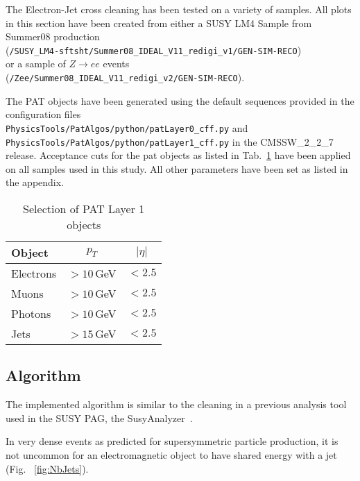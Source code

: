 \documentclass{cmspaper}
\begin{document}
The Electron-Jet cross cleaning has been tested on a variety of samples. All
plots in this section have been created from either a SUSY LM4 Sample from
Summer08 production\\
(\texttt{/SUSY\_LM4-sftsht/Summer08\_IDEAL\_V11\_redigi\_v1/GEN-SIM-RECO})\\
or a sample of
$Z\rightarrow ee$ events \\(\texttt{/Zee/Summer08\_IDEAL\_V11\_redigi\_v2/GEN-SIM-RECO}).

The PAT objects have been generated using the default sequences provided in the
configuration files\\
\texttt{PhysicsTools/PatAlgos/python/patLayer0\_cff.py} and\\
\texttt{PhysicsTools/PatAlgos/python/patLayer1\_cff.py} in the CMSSW\_2\_2\_7
release. Acceptance cuts for the pat objects as listed in
Tab.~\ref{tab:PATobjCuts} have been applied on all samples used in this study.
All other parameters have been set as listed in the appendix.

\begin{table}[h]
\caption{Selection of PAT Layer 1 objects}
\begin{center}
\begin{tabular}{l|c|c}
\textbf{Object} & \textbf{$p_T$} & \textbf{$|\eta|$} \\ \hline
    Electrons & $>10$\,GeV & $<2.5$  \\\hline
    Muons     & $>10$\,GeV & $<2.5$  \\\hline
    Photons   & $>10$\,GeV & $<2.5$  \\\hline
    Jets      & $>15$\,GeV & $<2.5$
\end{tabular}
\end{center}
\label{tab:PATobjCuts}
\end{table}

\subsection{Algorithm}
The implemented algorithm is similar to the cleaning in a previous analysis
tool used in the SUSY PAG, the SusyAnalyzer~\cite{wikiSusyAnalyzer}.

In very dense events as predicted for supersymmetric particle production, it is
not uncommon for an electromagnetic object to have shared energy with a jet
(Fig. ~\ref{fig:NbJets}).
\end{document}

